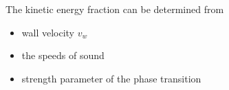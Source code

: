 The kinetic energy fraction can be determined from
\begin{itemize}
\item wall velocity $v_w$
\item the speeds of sound
\item strength parameter of the phase transition
\end{itemize}
\fi


\iffalse
\section{Extensions of the standard model}
Extensions of the Standard model \cite{caprini_detecting_2020}
(mentioned in \cite[p. 14]{lecture_notes})

\section{Noise background}
Non-thermal phenomena: GW production by preheating, when the inflaton decays to SM particles.
\cite{lecture_notes}
\fi
